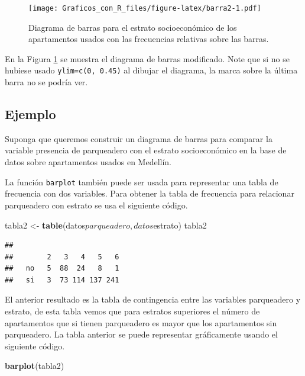 \documentclass[10pt,]{krantz}
\makeatletter
\newenvironment{Shaded}{\begin{snugshade}}{\end{snugshade}}
\newcommand{\KeywordTok}[1]{\textcolor[rgb]{0.13,0.29,0.53}{\textbf{{#1}}}}
\newcommand{\StringTok}[1]{\textcolor[rgb]{0.31,0.60,0.02}{{#1}}}
\newcommand{\NormalTok}[1]{{#1}}
\newenvironment{kframe}{%
\medskip{}
\setlength{\fboxsep}{.8em}
 \def\at@end@of@kframe{}%
 \ifinner\ifhmode%
  \def\at@end@of@kframe{\end{minipage}}%
  \begin{minipage}{\columnwidth}%
 \fi\fi%
 \def\FrameCommand##1{\hskip\@totalleftmargin \hskip-\fboxsep
 \colorbox{shadecolor}{##1}\hskip-\fboxsep
     \hskip-\linewidth \hskip-\@totalleftmargin \hskip\columnwidth}%
 \MakeFramed {\advance\hsize-\width
   \@totalleftmargin\z@ \linewidth\hsize
   \@setminipage}}%
 {\par\unskip\endMakeFramed%
 \at@end@of@kframe}
\renewenvironment{Shaded}{\begin{kframe}}{\end{kframe}}
\makeatother
\begin{document}
\begin{figure}[htbp]
\centering
\texttt{[image: Graficos\_con\_R\_files/figure-latex/barra2-1.pdf]}
\caption{\label{fig:barra2}Diagrama de barras para el estrato socioeconómico
de los apartamentos usados con las frecuencias relativas sobre las
barras.}
\end{figure}

En la Figura \ref{fig:barra2} se muestra el diagrama de barras
modificado. Note que si no se hubiese usado \texttt{ylim=c(0,\ 0.45)} al
dibujar el diagrama, la marca sobre la última barra no se podría ver.

\subsection*{Ejemplo}\label{ejemplo-20}


Suponga que queremos construir un diagrama de barras para comparar la
variable presencia de parqueadero con el estrato socioeconómico en la
base de datos sobre apartamentos usados en Medellín.

La función \texttt{barplot} también puede ser usada para representar una
tabla de frecuencia con dos variables. Para obtener la tabla de
frecuencia para relacionar parqueadero con estrato se usa el siguiente
código.

\begin{Shaded}
\begin{Highlighting}[]
\NormalTok{tabla2 <-}\StringTok{ }\KeywordTok{table}\NormalTok{(datos$parqueadero, datos$estrato)}
\NormalTok{tabla2}
\end{Highlighting}
\end{Shaded}

\begin{verbatim}
##     
##        2   3   4   5   6
##   no   5  88  24   8   1
##   si   3  73 114 137 241
\end{verbatim}

El anterior resultado es la tabla de contingencia entre las variables
parqueadero y estrato, de esta tabla vemos que para estratos superiores
el número de apartamentos que si tienen parqueadero es mayor que los
apartamentos sin parqueadero. La tabla anterior se puede representar
gráficamente usando el siguiente código.

\begin{Shaded}
\begin{Highlighting}[]
\KeywordTok{barplot}\NormalTok{(tabla2)}
\end{Highlighting}
\end{Shaded}
\end{document}
